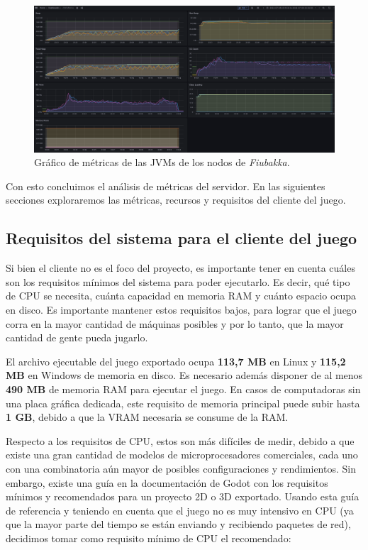 \begin{figure}[htbp]
    \centering
    \includegraphics[width=1\textwidth]{../assets/jvm-metrics.png}
    \caption{Gráfico de métricas de las JVMs de los nodos de \textit{Fiubakka}.}
\end{figure}

\newpage

Con esto concluimos el análisis de métricas del servidor. En las siguientes secciones exploraremos las métricas, recursos y requisitos
del cliente del juego.

\subsection{Requisitos del sistema para el cliente del juego}

\noindent Si bien el cliente no es el foco del proyecto, es importante tener en cuenta cuáles son los 
requisitos mínimos del sistema para poder ejecutarlo. Es decir, qué tipo de CPU se necesita,
cuánta capacidad en memoria RAM y cuánto espacio ocupa en disco. Es importante mantener estos requisitos
bajos, para lograr que el juego corra en la mayor cantidad de máquinas posibles y por lo tanto,
que la mayor cantidad de gente pueda jugarlo.

El archivo ejecutable del juego exportado ocupa \textbf{113,7 MB} en Linux y \textbf{115,2 MB} en Windows de memoria en disco.
Es necesario además disponer de al menos \textbf{490 MB} de memoria RAM para ejecutar el juego.
En casos de computadoras sin una placa gráfica dedicada, este requisito de memoria principal puede subir
hasta \textbf{1 GB}, debido a que la VRAM necesaria se consume de la RAM.

Respecto a los requisitos de CPU, estos son más difíciles de medir, debido a que existe una gran cantidad
de modelos de microprocesadores comerciales, cada uno con una combinatoria aún mayor de posibles
configuraciones y rendimientos. Sin embargo, existe una guía en la documentación de Godot \cite{ref3}
con los requisitos mínimos y recomendados para un proyecto 2D o 3D exportado.
Usando esta guía de referencia y teniendo en cuenta que el juego no es muy intensivo en CPU (ya que la mayor parte del tiempo se están enviando y recibiendo paquetes de red), decidimos
tomar como requisito mínimo de CPU el recomendado:

